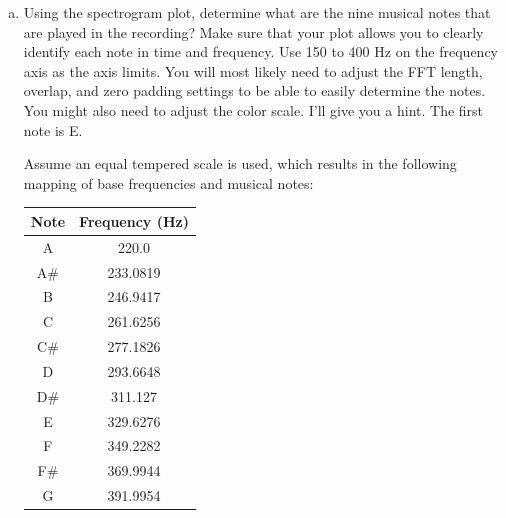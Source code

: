 \begin{enumerate}
\begin{enumerate}[a)]
\item Using the spectrogram plot, determine what are the nine musical
  notes that are played in the recording? Make sure that your plot
  allows you to clearly identify each note in time and frequency. Use
  150 to 400 Hz on the frequency axis as the axis limits. You will
  most likely need to adjust the FFT length, overlap, and zero padding
  settings to be able to easily determine the notes. You might also
  need to adjust the color scale. I'll give you a hint. The first note
  is E.

Assume an equal tempered scale is used, which results in the following mapping of base frequencies and musical notes: 
\begin{center}
\begin{tabular}{c|c}
Note & Frequency (Hz) \\
\hline 
A & 220.0\\
A\# & 233.0819 \\
B & 246.9417 \\
C & 261.6256 \\
C\# & 277.1826 \\
D & 293.6648 \\
D\# & 311.127 \\
E & 329.6276 \\
F & 349.2282 \\
F\# & 369.9944 \\
G & 391.9954 
\end{tabular}
\end{center}




\end{enumerate}
\end{enumerate}
